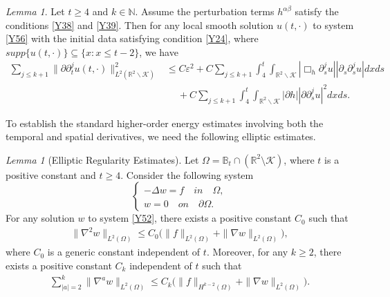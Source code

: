 \documentclass[11pt, reqno]{amsart}
\theoremstyle{definition}
\theoremstyle{remark}
\newtheorem{lem}[thm]{Lemma}
\theoremstyle{definition}
\numberwithin{equation}{section}
\numberwithin{equation}{section}
\def\leq{\leqslant}
\def\geq{\geqslant}
\begin{document}
\begin{lem}\label{lem10}
Let $t\geq4$ and $k\in\mathbb N$.  Assume the perturbation terms
$h^{\alpha\beta}$ satisfy the conditions \eqref{Y38} and \eqref{Y39}.
Then for any local smooth solution $u(t,\cdot)$ to system \eqref{Y56}
with the initial data satisfying condition \eqref{Y24}, where
$supp\{u(t,\cdot)\}\subseteq\{x:x\leq t-2\}$, we have
\begin{align*}
\sum_{j\leq
k+1}\|\partial\partial_t^ju(t,\cdot)\|^2_{L^2(\mathbb
R^2\backslash\mathcal {K})}&\leq
C\varepsilon^2+C\sum_{j\leq k+1}\int_4^t\int_{\mathbb R^2\backslash\mathcal
{K}}|\Box_h
\partial_s^ju||\partial_s\partial_s^ju|dxds
\nonumber\\&\quad\ +C\sum_{j\leq
k+1}\int_4^t\int_{\mathbb R^2\backslash\mathcal
{K}}|\partial h||\partial\partial_s^ju|^2dxds.
\end{align*}
\end{lem}
To establish the standard higher-order energy estimates involving both the
temporal and spatial derivatives, we need the following
elliptic estimates.
\begin{lem}[Elliptic Regularity Estimates]\label{lem11}
Let $\Omega=\mathbb B_{t}\cap(\mathbb R^2\setminus\mathcal {K})$,
where $t$ is a positive constant and $t\geq4$. Consider the
following system
\begin{equation}\label{Y52}
\left \{
\begin{array}{llll}
-\Delta w=f \quad in \quad \Omega,  \\
w=0 \quad on \quad \partial\Omega.
\end{array} \right.
\end{equation}
For any solution $w$ to system \eqref{Y52}, there exists a positive
constant $C_0$ such that
\begin{align}\label{Y54}
\|\nabla^2w\|_{L^2(\Omega)}\leq C_0\big(\|f\|_{L^2(\Omega)}+\|\nabla
w\|_{L^2(\Omega)}\big),
\end{align}
where $C_0$ is a generic constant independent of $t$. Moreover, for any $k\geq2$, there
exists a positive constant $C_k$ independent of $t$ such that
\begin{align}\label{Y55}
\sum_{|a|=2}^k\|\nabla^aw\|_{L^2(\Omega)}\leq
C_k\big(\|f\|_{H^{k-2}(\Omega)}+\|\nabla w\|_{L^2(\Omega)}\big).
\end{align}
\end{lem}
\end{document}
